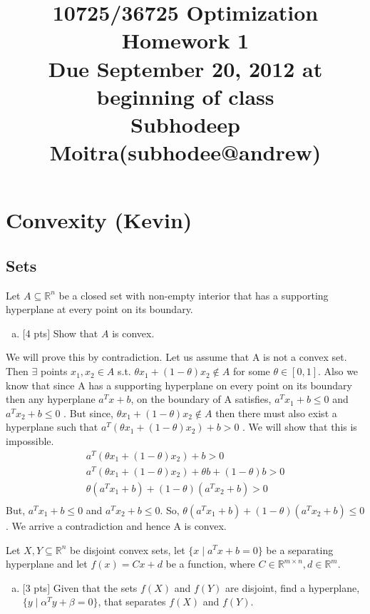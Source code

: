 \documentclass[12pt]{article}
\title{10725/36725 Optimization \\Homework 1\\
{\small Due September 20, 2012 at beginning of class} \\
{Subhodeep Moitra(subhodee@andrew)}
}
\date{}
\begin{document}
\maketitle


\newpage
\clearpage

\section{Convexity (Kevin)}

\subsection{Sets}

Let $A\subseteq\mathbb{R}^n$ be a closed set with non-empty interior that has a supporting hyperplane at every point on its boundary.
\begin{enumerate}[(a)]
\item $[$4 pts$]$ 
Show that $A$ is convex.
\end{enumerate}

We will prove this by contradiction. Let us assume that A is not a convex set. Then $\exists$ points $x_1 , x_2 \in A$ s.t. $\theta x_1 + (1-\theta) x_2 \notin A$ for some $\theta \in [0,1]$. Also we know that since A has a supporting hyperplane on every point on its boundary then any hyperplane $a^Tx+b$, on the boundary of A satisfies, $a^Tx_1+b\leq 0$ and $a^Tx_2+b\leq 0$ . But since, $\theta x_1 + (1-\theta) x_2 \notin A$ then there must also exist a hyperplane such that $a^T(\theta x_1 + (1-\theta) x_2)+b > 0$ . We will show that this is impossible. 
\begin{align*}
a^T(\theta x_1 + (1-\theta) x_2)+b > 0 \\
a^T(\theta x_1 + (1-\theta) x_2)+\theta b + (1-\theta)b > 0\\
\theta(a^T x_1+b) + (1-\theta)(a^T x_2+b)  > 0 \\
\end{align*}
But, $ a^Tx_1+b\leq 0$ and $a^Tx_2+b\leq 0$. So, $\theta(a^T x_1+b) + (1-\theta)(a^T x_2+b) \leq 0 $. We arrive a contradiction and hence A is convex.

\vspace{.25cm}

\noindent Let $X,Y\subseteq\mathbb{R}^n$ be disjoint convex sets, let $\{x \mid a^Tx + b = 0\}$ be a separating hyperplane and let $f(x) = Cx + d$ be a function, where $C\in\mathbb{R}^{m\times n},d\in\mathbb{R}^m$.
\begin{enumerate}[(b)]
\item
$[$3 pts$]$ Given that the sets $f(X)$ and $f(Y)$ are disjoint, find a hyperplane, $\{ y \mid \alpha^Ty + \beta = 0 \}$, that separates $f(X)$ and $f(Y)$.
\end{enumerate}
\end{document}
